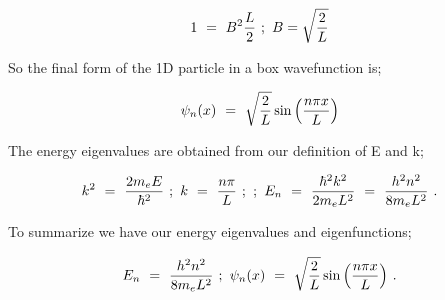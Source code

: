 \documentclass{article}
\begin{document}
\begin{equation} \label{eq:238}
1 \hspace{0.125cm} = \hspace{0.125cm} B^2 \frac{L}{2} \hspace{0.125cm} ; \hspace{0.125cm} B = \sqrt{\frac{2}{L}}
\end{equation}

So the final form of the 1D particle in a box wavefunction is; 

\begin{equation} \label{eq:239}
\psi_{n}(x) \hspace{0.125cm} = \hspace{0.125cm} \sqrt{\frac{2}{L}}\sin\Big( \frac{n\pi x}{L} \Big)
\end{equation}

The energy eigenvalues are obtained from our definition of E and k;

\begin{equation} \label{eq:240}
k^2 \hspace{0.125cm} = \hspace{0.125cm} \frac{2m_{e}E}{\hbar^2} \hspace{0.125cm} ; \hspace{0.125cm} k \hspace{0.125cm} = \hspace{0.125cm} \frac{n\pi}{L} \hspace{0.125cm} ; \hspace{0.125cm} ; \hspace{0.125cm} E_n \hspace{0.125cm} = \hspace{0.125cm} \frac{\hbar^{2}k^{2}}{2m_{e}L^{2}} \hspace{0.125cm} = \hspace{0.125cm} \frac{h^{2}n^{2}}{8m_{e}L^{2}} \hspace{0.125cm} . 
\end{equation}

To summarize we have our energy eigenvalues and eigenfunctions; 

\begin{equation} \label{eq:241}
E_n \hspace{0.125cm} = \hspace{0.125cm} \frac{h^{2}n^{2}}{8m_{e}L^{2}} \hspace{0.125cm} ; \hspace{0.125cm} \psi_{n}(x) \hspace{0.125cm} = \hspace{0.125cm} \sqrt{\frac{2}{L}}\sin\Big( \frac{n\pi x}{L} \Big) \hspace{0.125cm} . 
\end{equation}
\end{document}
